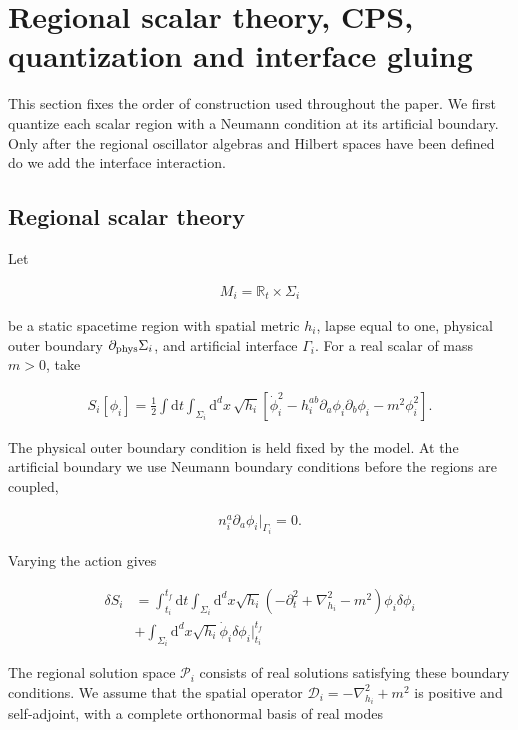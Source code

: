 \section{Regional scalar theory, CPS, quantization and interface gluing}\label{sec:regional-quantum-gluing}

This section fixes the order of construction used throughout the paper. We first quantize each scalar region with a Neumann condition at its artificial boundary. Only after the regional oscillator algebras and Hilbert spaces have been defined do we add the interface interaction.

\subsection{Regional scalar theory}\label{subsec:regional-scalar}

Let

\begin{align}
M_i=\mathbb R_t\times\Sigma_i
\end{align}

be a static spacetime region with spatial metric $h_i$, lapse equal to one, physical outer boundary $\partial_{\rm phys}\Sigma_i$, and artificial interface $\Gamma_i$. For a real scalar of mass $m>0$, take

\begin{align}
S_i[\phi_i]
=\frac12\int\mathrm dt\int_{\Sigma_i}\mathrm d^{d}x\,\sqrt{h_i}
\left[
\dot\phi_i^2-h_i^{ab}\partial_a\phi_i\partial_b\phi_i-m^2\phi_i^2
\right].
\end{align}

The physical outer boundary condition is held fixed by the model. At the artificial boundary we use Neumann boundary conditions before the regions are coupled,

\begin{align}
n_i^a\partial_a\phi_i\big|_{\Gamma_i}=0.
\end{align}

Varying the action gives

\begin{align}
  \delta S_{i} & = \int _{t_{i}}^{t_{f}} \mathrm{d}t\int _{\Sigma _{i}}\mathrm{d}^{d}x\sqrt{ h_{i} }(-\partial _{t}^{2}+\nabla ^{2}_{h_{i}}-m^{2})\phi _{i}\delta \phi _{i} \\
 & +\int _{\Sigma _{i}}\mathrm{d}^{d}x \sqrt{ h_{i} } \dot{\phi}_{i}\delta \phi _{i}|^{t_{f}}_{t_{i}}
\end{align}

The regional solution space $\mathcal P_i$ consists of real solutions satisfying these boundary conditions. We assume that the spatial operator $\mathcal{D}_i=-\nabla ^{2}_{h_{i}}+m^{2}$ is positive and self-adjoint, with a complete orthonormal basis of real modes

